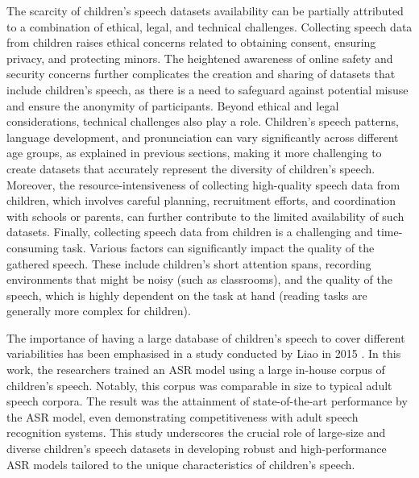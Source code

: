The scarcity of children's speech datasets availability can be partially attributed to a combination of ethical, legal, and technical challenges. Collecting speech data from children raises ethical concerns related to obtaining consent, ensuring privacy, and protecting minors. The heightened awareness of online safety and security concerns further complicates the creation and sharing of datasets that include children's speech, as there is a need to safeguard against potential misuse and ensure the anonymity of participants.
Beyond ethical and legal considerations, technical challenges also play a role. Children's speech patterns, language development, and pronunciation can vary significantly across different age groups, as explained in previous sections, making it more challenging to create datasets that accurately represent the diversity of children's speech. Moreover, the resource-intensiveness of collecting high-quality speech data from children, which involves careful planning, recruitment efforts, and coordination with schools or parents, can further contribute to the limited availability of such datasets.
Finally, collecting speech data from children is a challenging and time-consuming task. Various factors can significantly impact the quality of the gathered speech. These include children's short attention spans, recording environments that might be noisy (such as classrooms), and the quality of the speech, which is highly dependent on the task at hand (reading tasks are generally more complex for children).

The importance of having a large database of children's speech to cover different variabilities has been emphasised in a study conducted by Liao in 2015 \cite{asr-google}. In this work, the researchers trained an \ac{ASR} model using a large in-house corpus of children's speech. Notably, this corpus was comparable in size to typical adult speech corpora. The result was the attainment of state-of-the-art performance by the \ac{ASR} model, even demonstrating competitiveness with adult speech recognition systems. This study underscores the crucial role of large-size and diverse children's speech datasets in developing robust and high-performance \ac{ASR} models tailored to the unique characteristics of children's speech.


\newpage
